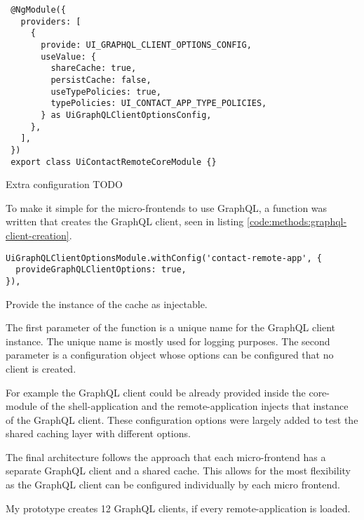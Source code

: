 \ifshowListings
\begin{listing}[H]
\begin{verbatim}
 @NgModule({
   providers: [
     {
       provide: UI_GRAPHQL_CLIENT_OPTIONS_CONFIG,
       useValue: {
         shareCache: true,
         persistCache: false,
         useTypePolicies: true,
         typePolicies: UI_CONTACT_APP_TYPE_POLICIES,
       } as UiGraphQLClientOptionsConfig,
     },
   ],
 })
 export class UiContactRemoteCoreModule {}
\end{verbatim}
\caption{Extra configuration TODO}\label{code:methods:graphql-client-extra-configuration-options}
\end{listing}
\fi

To make it simple for the micro-frontends to use GraphQL, a function was written that creates the GraphQL client, seen in listing \ref{code:methods:graphql-client-creation}.

\ifshowListings
\begin{listing}[H]
\begin{verbatim}
UiGraphQLClientOptionsModule.withConfig('contact-remote-app', {
  provideGraphQLClientOptions: true,
}),
\end{verbatim}
\caption{Provide the instance of the cache as injectable.}\label{code:methods:graphql-client-creation}
\end{listing}
\fi

The first parameter of the function is a unique name for the GraphQL client instance. The unique name is mostly used for logging purposes. The second parameter is a configuration object whose options can be configured that no client is created.

For example the GraphQL client could be already provided inside the core-module of the shell-application and the remote-application injects that instance of the GraphQL client. These configuration options were largely added to test the shared caching layer with different options.

The final architecture follows the approach that each micro-frontend has a separate GraphQL client and a shared cache. This allows for the most flexibility as the GraphQL client can be configured individually by each micro frontend.


My prototype creates 12 GraphQL clients, if every remote-application is loaded.

